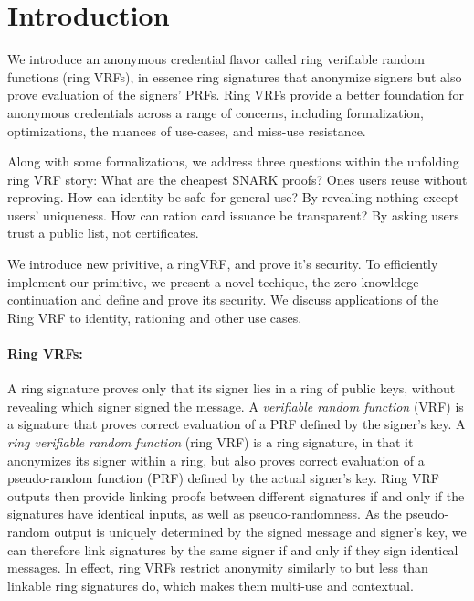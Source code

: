 \section{Introduction}

\def\qaudbreak{\eprint{\quad}{\\}}


We introduce an anonymous credential flavor called
ring verifiable random functions (ring VRFs),
in essence ring signatures that anonymize signers but
also prove evaluation of the signers' PRFs.
Ring VRFs provide a better foundation for anonymous credentials
across a range of concerns, including formalization, optimizations,
the nuances of use-cases, and miss-use resistance.

Along with some formalizations, we address three questions within
the unfolding ring VRF story:
What are the cheapest SNARK proofs?  Ones users reuse without reproving.
How can identity be safe for general use?  By revealing nothing except users' uniqueness.
How can ration card issuance be transparent?  By asking users trust a public list, not certificates.

We introduce new privitive, a ringVRF, and prove it's security. To efficiently implement our primitive, we present a novel techique, the zero-knowldege continuation and define and prove its security. We discuss applications of the Ring VRF to identity, rationing and other use cases.



\paragraph{Ring VRFs:}

A ring signature \cite{ring_accountable,ring_efficient,ring_linkable,ring_noRO,ring_sublinear} proves only that its  signer lies in a ring
of public keys, without revealing which signer  signed the message.
A {\it verifiable random function} (VRF) is a signature that proves
correct evaluation of a PRF defined by the signer's key.
A {\it ring verifiable random function} (ring VRF) is a ring signature, in
that it anonymizes its  signer within a ring,
but also proves correct evaluation of a pseudo-random function (PRF)
defined by the actual signer's key. %
%
Ring VRF outputs then provide linking proofs between different signatures
if and only if  the signatures have identical inputs, as well as pseudo-randomness.
As the pseudo-random output is uniquely determined by the signed message
and signer's  key, we can therefore link signatures by the
same signer if and only if they sign identical messages.
In effect, ring VRFs restrict anonymity similarly to but less than
linkable ring signatures \cite{ring_linkable,ring_linkablee}  do, which makes them multi-use and contextual.

